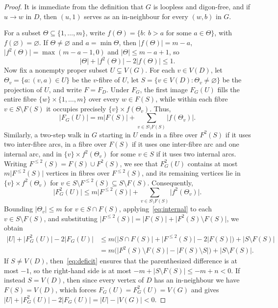 \documentclass[11pt]{amsart}
\theoremstyle{remark}
\newcommand{\abs}[1]{\lvert #1\rvert}
\begin{document}
\begin{proof}
It is immediate from the definition that $G$ is loopless and digon-free, and if $u\to w$ in $D$, then $(u,1)$ serves as an in-neighbour for every $(w,b)$ in $G$.

For a subset $\Theta\subseteq\{1,\dots,m\}$, write $f(\Theta)=\{b:\ b>a\text{ for some }a\in\Theta\}$, with $f(\varnothing)=\varnothing$. If $\Theta\neq\varnothing$ and $a=\min\Theta$, then $\abs{f(\Theta)}=m-a$, $\abs{f^2(\Theta)}=\max(m-a-1,0)$ and $\abs\Theta\le m-a+1$, so
\begin{equation}\label{eq:internal}
  \abs\Theta+\abs{f^2(\Theta)}-2\abs{f(\Theta)}\le 1.
\end{equation}
Now fix a nonempty proper subset $U\subsetneq V(G)$. For each $v\in V(D)$, let $\Theta_v=\{a:(v,a)\in U\}$ be the $v$-fibre of $U$, let $S=\{v\in V(D):\Theta_v\neq\varnothing\}$ be the projection of $U$, and write $F=F_D$. Under $F_G$, the first image $F_G(U)$ fills the entire fibre $\{w\}\times\{1,\dots,m\}$ over every $w\in F(S)$, while within each fibre $v\in S\setminus F(S)$ it occupies precisely $\{v\}\times f(\Theta_v)$. Thus,
\[
  \abs{F_G(U)}=m\abs{F(S)}+\sum_{v\in S\setminus F(S)}\abs{f(\Theta_v)}.
\]
Similarly, a two-step walk in $G$ starting in $U$ ends in a fibre over $F^2(S)$ if it uses two inter-fibre arcs, in a fibre over $F(S)$ if it uses one inter-fibre arc and one internal arc, and in $\{v\}\times f^2(\Theta_v)$ for some $v\in S$ if it uses two internal arcs. Writing $F^{\le2}(S)=F(S)\cup F^2(S)$, we see that $F_G^2(U)$ contains at most $m\abs{F^{\le2}(S)}$ vertices in fibres over $F^{\le2}(S)$, and its remaining vertices lie in $\{v\}\times f^2(\Theta_v)$ for $v\in S\setminus F^{\le2}(S)\subseteq S\setminus F(S)$. Consequently,
\[
  \abs{F^2_G(U)}\le m\abs{F^{\le2}(S)}+\sum_{v\in S\setminus F(S)}\abs{f^2(\Theta_v)}.
\]
Bounding $\abs{\Theta_v}\le m$ for $v\in S\cap F(S)$, applying~\eqref{eq:internal} to each $v\in S\setminus F(S)$, and substituting $\abs{F^{\le2}(S)}=\abs{F(S)}+\abs{F^2(S)\setminus F(S)}$, we obtain
\begin{align*}
  \abs U+\abs{F^2_G(U)}-2\abs{F_G(U)}
  &\le m\bigl(\abs{S\cap F(S)}+\abs{F^{\le2}(S)}-2\abs{F(S)}\bigr)+\abs{S\setminus F(S)}\\
  &= m\bigl(\abs{F^2(S)\setminus F(S)}-\abs{F(S)\setminus S}\bigr)+\abs{S\setminus F(S)}.
\end{align*}
If $S\neq V(D)$, then~\eqref{eq:deficit} ensures that the parenthesized difference is at most $-1$, so the right-hand side is at most $-m+\abs{S\setminus F(S)}\le -m+n<0$. If instead $S=V(D)$, then since every vertex of $D$ has an in-neighbour we have $F(S)=V(D)$, which forces $F_G(U)=F_G^2(U)=V(G)$ and gives $\abs U+\abs{F_G^2(U)}-2\abs{F_G(U)}=\abs U-\abs{V(G)}<0$.
\end{proof}
\end{document}
